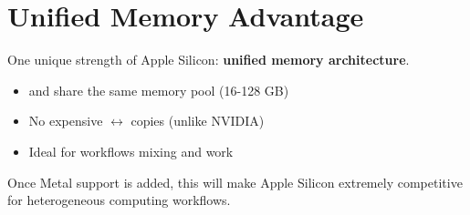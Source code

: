 \section{Unified Memory Advantage}

One unique strength of Apple Silicon: \textbf{unified memory architecture}.

\begin{itemize}[noitemsep]
  \item {} and  share the same memory pool (16-128 GB)
  \item No expensive $\leftrightarrow$ copies (unlike NVIDIA)
  \item Ideal for workflows mixing  and  work
\end{itemize}

Once Metal support is added, this will make Apple Silicon extremely competitive for heterogeneous computing workflows.

